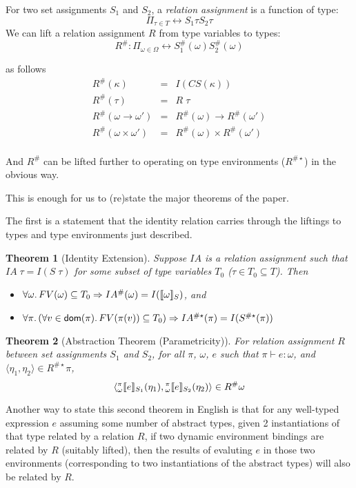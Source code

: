 \documentclass{article}
\newtheorem{theorem}{Theorem}
\begin{document}
For two set assignments $S_1$ and $S_2$, a \emph{relation assignment} is a function of type:
\[
    \Pi_{\tau\in T}\rel{S_1\tau}{S_2\tau}
\]
We can lift a relation assignment $R$ from type variables to types:
\[
    R^{\#} : 
    \Pi_{\omega\in\Omega}\rel{S_1^{\#}(\omega)}{S_2^{\#}(\omega)}
\]

as follows
\[
    \begin{array}{rcl}
    R^{\#}(\kappa) & = & I(CS(\kappa))\\
    R^{\#}(\tau) & = & R\;\tau\\
    R^{\#}(\omega\rightarrow\omega') & = & R^{\#}(\omega)\rightarrow R^{\#}(\omega')\\
    R^{\#}(\omega\times\omega') & = & R^{\#}(\omega)\times R^{\#}(\omega')\\
    \end{array}
\]

And $R^{\#}$ can be lifted further to operating on type environments ($R^{\#\star}$) in the obvious
way.

This is enough for us to (re)state the major theorems of the paper.

The first is a statement that the identity relation carries through the liftings to types and type
environments just described.
\begin{theorem}[Identity Extension]
Suppose $IA$ is a relation assignment such that $IA\;\tau=I(S\;\tau)$ for some subset of type
variables $T_0$ ($\tau\in
T_0\subseteq T$).  Then
\begin{itemize}
\item $\forall \omega\ldotp FV(\omega)\subseteq T_0 \Rightarrow IA^{\#}(\omega) = I(\llbracket \omega \rrbracket_{S})$, and
\item $\forall \pi\ldotp (\forall v\in\mathsf{dom}(\pi)\ldotp FV(\pi(v))\subseteq T_0) \Rightarrow
        IA^{\#\star}(\pi) = I(S^{\#\star}(\pi))$
\end{itemize}
\end{theorem}

\begin{theorem}[Abstraction Theorem (Parametricity)]
For relation assignment $R$ between set assignments $S_1$ and $S_2$, 
for all $\pi$, $\omega$, $e$ such that $\pi\vdash e : \omega$, and 
$\langle \eta_1, \eta_2\rangle\in R^{\#\star}\pi$,
\[
    \langle
    {}^{\pi}_{\omega}\llbracket e\rrbracket_{S_1}(\eta_1)
    ,
    {}^{\pi}_{\omega}\llbracket e\rrbracket_{S_2}(\eta_2)
    \rangle
    \in R^{\#}\omega
\]
\end{theorem}

Another way to state this second theorem in English is that for any well-typed expression $e$ assuming
some number of abstract types, given 2 instantiations of that type related by a relation $R$, if
two dynamic environment bindings are related by $R$ (suitably lifted), then the results of evaluting
$e$ in those two environments (corresponding to two instantiations of the abstract types) will also
be related by $R$.
\end{document}
